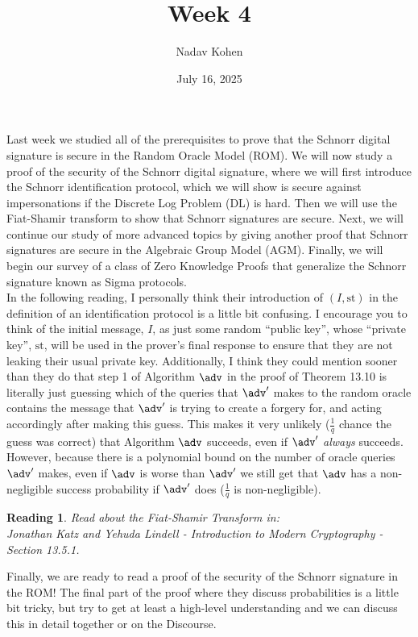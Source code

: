 \documentclass[12pt]{article}
\newtheorem{reading}{Reading}
\theoremstyle{definition}
\theoremstyle{remark}
\theoremstyle{definition}
\begin{document}
\title{Week 4}
\author{Nadav Kohen}
\date{July 16, 2025}
\maketitle

Last week we studied all of the prerequisites to prove that the Schnorr digital signature is secure in the Random Oracle Model (ROM). We will now study a proof of the security of the Schnorr digital signature, where we will first introduce the Schnorr identification protocol, which we will show is secure against impersonations if the Discrete Log Problem (DL) is hard. Then we will use the Fiat-Shamir transform to show that Schnorr signatures are secure. Next, we will continue our study of more advanced topics by giving another proof that Schnorr signatures are secure in the Algebraic Group Model (AGM). Finally, we will begin our survey of a class of Zero Knowledge Proofs that generalize the Schnorr signature known as Sigma protocols.\\

In the following reading, I personally think their introduction of $(I, \text{st})$ in the definition of an identification protocol is a little bit confusing. I encourage you to think of the initial message, $I$, as just some random ``public key'', whose ``private key'', $\text{st}$, will be used in the prover's final response to ensure that they are not leaking their usual private key. Additionally, I think they could mention sooner than they do that step 1 of Algorithm $\adv$ in the proof of Theorem 13.10 is literally just guessing which of the queries that $\adv'$ makes to the random oracle contains the message that $\adv'$ is trying to create a forgery for, and acting accordingly after making this guess. This makes it very unlikely ($\frac{1}{q}$ chance the guess was correct) that Algorithm $\adv$ succeeds, even if $\adv'$ \emph{always} succeeds. However, because there is a polynomial bound on the number of oracle queries $\adv'$ makes, even if $\adv$ is worse than $\adv'$ we still get that $\adv$ has a non-negligible success probability if $\adv'$ does ($\frac{1}{q}$ is non-negligible).

\begin{reading}
Read about the Fiat-Shamir Transform in:\\
Jonathan Katz and Yehuda Lindell - Introduction to Modern Cryptography - Section 13.5.1.
\end{reading}

Finally, we are ready to read a proof of the security of the Schnorr signature in the ROM! The final part of the proof where they discuss probabilities is a little bit tricky, but try to get at least a high-level understanding and we can discuss this in detail together or on the Discourse.
\end{document}
